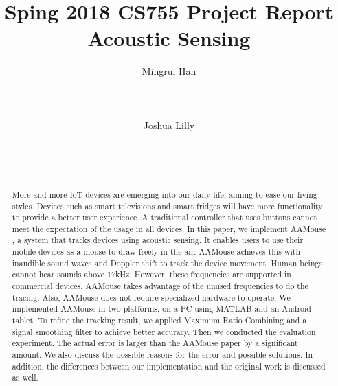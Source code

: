 \documentclass{acm_proc_article-sp}
\begin{document}
\title{Sping 2018 CS755 Project Report Acoustic Sensing}

\author{
\alignauthor
Mingrui Han\\
       \\
       \\
       \\
\alignauthor
Joshua Lilly\\
       \\
       \\
       \\
}

\maketitle
\begin{abstract}
More and more IoT devices are emerging into our daily life, aiming to ease
our living styles. Devices such as smart televisions and smart fridges
will have more functionality to provide a better user experience.
A traditional controller that uses buttons cannot meet the expectation
of the usage in all devices. In this paper, we implement AAMouse \cite{yun:turning}, a system that tracks devices using acoustic sensing. It enables
users to use their mobile devices as a mouse to
draw freely in the air. AAMouse achieves this with inaudible sound waves and Doppler shift to track the device movement. Human beings cannot
hear sounds above 17kHz. However, these frequencies 
are supported in commercial devices. AAMouse takes advantage of the
unused frequencies to do the tracing. Also, AAMouse does not require specialized 
hardware to operate. We implemented AAMouse in two platforms, on a PC using MATLAB and an Android tablet. To refine the tracking result, we applied Maximum
Ratio Combining and a signal smoothing filter to achieve better accuracy. Then we conducted the 
evaluation experiment. The actual error is larger than the AAMouse
paper by a significant amount. We also discuss the possible reasons for the error and possible solutions. In 
addition, the differences between our implementation and the 
original work is discussed as well.
\end{abstract}

\end{document}
